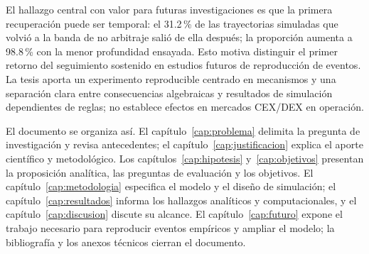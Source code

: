 El hallazgo central con valor para futuras investigaciones es que la primera recuperación puede ser temporal: el 31.2\,\% de las trayectorias simuladas que volvió a la banda de no arbitraje salió de ella después; la proporción aumenta a 98.8\,\% con la menor profundidad ensayada. Esto motiva distinguir el primer retorno del seguimiento sostenido en estudios futuros de reproducción de eventos. La tesis aporta un experimento reproducible centrado en mecanismos y una separación clara entre consecuencias algebraicas y resultados de simulación dependientes de reglas; no establece efectos en mercados CEX/DEX en operación.

El documento se organiza así. El capítulo~\ref{cap:problema} delimita la pregunta de investigación y revisa antecedentes; el capítulo~\ref{cap:justificacion} explica el aporte científico y metodológico. Los capítulos~\ref{cap:hipotesis} y~\ref{cap:objetivos} presentan la proposición analítica, las preguntas de evaluación y los objetivos. El capítulo~\ref{cap:metodologia} especifica el modelo y el diseño de simulación; el capítulo~\ref{cap:resultados} informa los hallazgos analíticos y computacionales, y el capítulo~\ref{cap:discusion} discute su alcance. El capítulo~\ref{cap:futuro} expone el trabajo necesario para reproducir eventos empíricos y ampliar el modelo; la bibliografía y los anexos técnicos cierran el documento.
